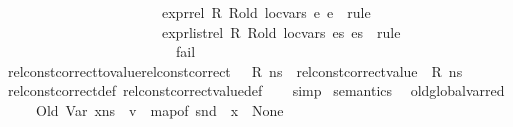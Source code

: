 \begin{isabellebody}
\ \ \ \ \ \ \ \ \ \ \ \ \ \ \ \ \ \ \ \ \ \ \ {\isachardoublequoteopen}expr{\isacharunderscore}{\kern0pt}rel\ {\isacharquery}{\kern0pt}R\ {\isacharquery}{\kern0pt}R{\isacharunderscore}{\kern0pt}old\ {\isacharquery}{\kern0pt}loc{\isacharunderscore}{\kern0pt}vars\ {\isacharquery}{\kern0pt}e{}\ {\isacharquery}{\kern0pt}e{}{\isachardoublequoteclose}\ {\isasymRightarrow}\ rule\ {\isasymbar}\isanewline
\ \ \ \ \ \ \ \ \ \ \ \ \ \ \ \ \ \ \ \ \ \ \ {\isachardoublequoteopen}expr{\isacharunderscore}{\kern0pt}list{\isacharunderscore}{\kern0pt}rel\ {\isacharquery}{\kern0pt}R\ {\isacharquery}{\kern0pt}R{\isacharunderscore}{\kern0pt}old\ {\isacharquery}{\kern0pt}loc{\isacharunderscore}{\kern0pt}vars\ {\isacharquery}{\kern0pt}es{}\ {\isacharquery}{\kern0pt}es{}{\isachardoublequoteclose}\ {\isasymRightarrow}\ rule\ {\isasymbar}\ \isanewline
\ \ \ \ \ \ \ \ \ \ \ \ \ \ \ \ \ \ \ \ \ \ \ {\isachardoublequoteopen}{\isacharunderscore}{\kern0pt}{\isachardoublequoteclose}\ {\isasymRightarrow}\ fail{\isacharparenright}{\kern0pt}{\isacharplus}{\kern0pt}\isanewline
\isanewline
{}\isamarkupfalse%
\ rel{\isacharunderscore}{\kern0pt}const{\isacharunderscore}{\kern0pt}correct{\isacharunderscore}{\kern0pt}to{\isacharunderscore}{\kern0pt}value{\isacharcolon}{\kern0pt}{\isachardoublequoteopen}rel{\isacharunderscore}{\kern0pt}const{\isacharunderscore}{\kern0pt}correct\ {\isasymLambda}\ {\isasymOmega}\ R\ ns{}\ {\isasymLongrightarrow}\ rel{\isacharunderscore}{\kern0pt}const{\isacharunderscore}{\kern0pt}correct{\isacharunderscore}{\kern0pt}value\ {\isasymLambda}\ R\ ns{}{\isachardoublequoteclose}\isanewline
%
\isadelimproof
\ \ %
\endisadelimproof
%
\isatagproof
{}\isamarkupfalse%
\ rel{\isacharunderscore}{\kern0pt}const{\isacharunderscore}{\kern0pt}correct{\isacharunderscore}{\kern0pt}def\ rel{\isacharunderscore}{\kern0pt}const{\isacharunderscore}{\kern0pt}correct{\isacharunderscore}{\kern0pt}value{\isacharunderscore}{\kern0pt}def\isanewline
\ \ \isamarkupfalse%
\ simp%
\endisatagproof
{\isafoldproof}%
%
\isadelimproof
\isanewline
%
\endisadelimproof
\isanewline
\isanewline
{}\isamarkupfalse%
\ semantics\ \isanewline
\isanewline
{}\isamarkupfalse%
\ old{\isacharunderscore}{\kern0pt}global{\isacharunderscore}{\kern0pt}var{\isacharunderscore}{\kern0pt}red{\isacharcolon}{\kern0pt}\isanewline
\ \ \ {\isachardoublequoteopen}{\isasymLambda}{\isacharcomma}{\kern0pt}{\isasymGamma}{\isacharcomma}{\kern0pt}{\isasymOmega}\ {\isasymturnstile}\ {\isasymlangle}Old\ {\isacharparenleft}{\kern0pt}Var\ x{\isacharparenright}{\kern0pt}{\isacharcomma}{\kern0pt}ns{\isasymrangle}\ {\isasymDown}\ v{\isachardoublequoteclose}\ \ {\isachardoublequoteopen}map{\isacharunderscore}{\kern0pt}of\ {\isacharparenleft}{\kern0pt}snd\ {\isasymLambda}{\isacharparenright}{\kern0pt}\ x\ {\isacharequal}{\kern0pt}\ None{\isachardoublequoteclose}\isanewline

\end{isabellebody}
